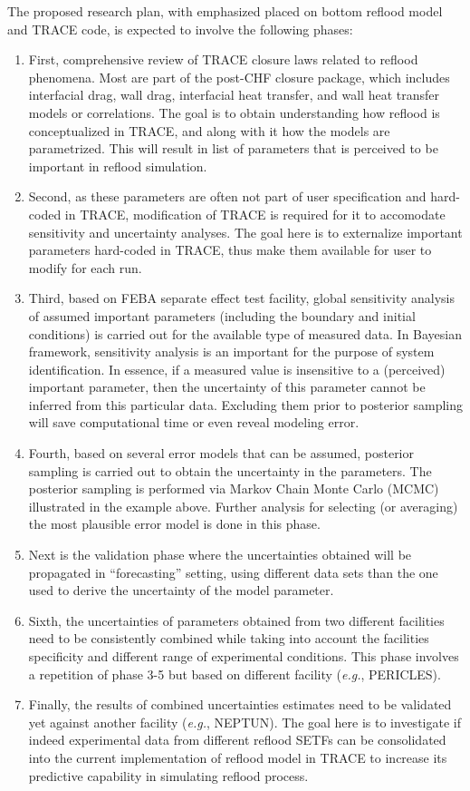 \documentclass[11pt,titlepage]{article}
\begin{document}
The proposed research plan, with emphasized placed on bottom reflood model and TRACE code, is expected to involve the following phases:
\begin{enumerate}
    \item First, comprehensive review of TRACE closure laws related to reflood phenomena. 
    Most are part of the post-CHF closure package, which includes interfacial drag, wall drag, interfacial heat transfer, and wall heat transfer models or correlations. 
    The goal is to obtain understanding how reflood is conceptualized in TRACE, and along with it how the models are parametrized. 
    This will result in list of parameters that is perceived to be important in reflood simulation.
    \item Second, as these parameters are often not part of user specification and hard-coded in TRACE, modification of TRACE is required for it to accomodate sensitivity and uncertainty analyses. 
    The goal here is to externalize important parameters hard-coded in TRACE, thus make them available for user to modify for each run.  
    \item Third, based on FEBA separate effect test facility, global sensitivity analysis of assumed important parameters (including the boundary and initial conditions) is carried out for the available type of measured data. 
    In Bayesian framework, sensitivity analysis is an important for the purpose of system identification. 
    In essence, if a measured value is insensitive to a (perceived) important parameter, then the uncertainty of this parameter cannot be inferred from this particular data. 
    Excluding them prior to posterior sampling will save computational time or even reveal modeling error.
    \item Fourth, based on several error models that can be assumed, posterior sampling is carried out to obtain the uncertainty in the parameters. 
    The posterior sampling is performed via Markov Chain Monte Carlo (MCMC) illustrated in the example above. 
    Further analysis for selecting (or averaging) the most plausible error model is done in this phase.
    \item Next is the validation phase where the uncertainties obtained will be propagated in ``forecasting'' setting, using different data sets than the one used to derive the uncertainty of the model parameter. 
    \item Sixth, the uncertainties of parameters obtained from two different facilities need to be consistently combined while taking into account the facilities specificity and different range of experimental conditions. 
    This phase involves a repetition of phase 3-5 but based on different facility (\textit{e.g.}, PERICLES). 
    \item Finally, the results of combined uncertainties estimates need to be validated yet against another facility (\textit{e.g.}, NEPTUN). 
    The goal here is to investigate if indeed experimental data from different reflood SETFs can be consolidated into the current implementation of reflood model in TRACE to increase its predictive capability in simulating reflood process.
\end{enumerate}
\end{document}
